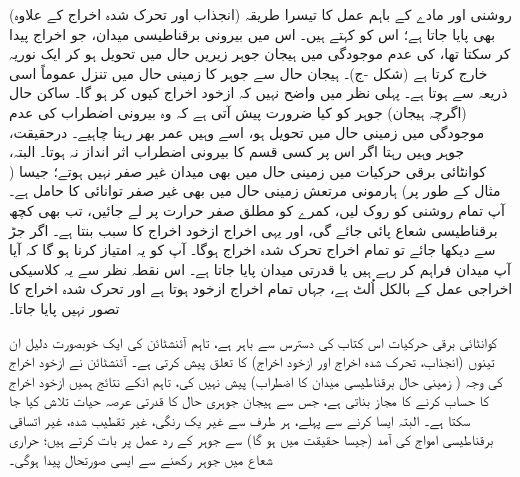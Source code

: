 (انجذاب اور تحرک شدہ اخراج کے علاوہ) روشنی اور مادے کے باہم عمل کا تیسرا طریقہ بھی پایا جاتا ہے؛ اس کو  کہتے ہیں۔ اس میں بیرونی برقناطیسی میدان، جو اخراج پیدا کر سکتا تھا، کی عدم موجودگی میں ہیجان جوہر زیریں حال میں تحویل ہو کر ایک نوریہ خارج کرتا ہے (شکل -ج)۔ 	ہیجان حال سے جوہر کا زمینی حال میں تنزل عموماً اسی ذریعہ سے ہوتا ہے۔ پہلی نظر میں واضح نہیں کہ ازخود اخراج کیوں کر ہو گا۔ ساکن حال (اگرچہ ہیجان) جوہر کو کیا ضرورت پیش آتی ہے کہ وہ بیرونی اضطراب کی عدم موجودگی میں زمینی حال میں تحویل ہو، اسے وہیں عمر بھر رہنا چاہیے۔ درحقیقت، جوہر وہیں رہتا اگر اس پر کسی قسم کا بیرونی اضطراب اثر انداز نہ ہوتا۔ البتہ، کوانٹائی برقی حرکیات میں زمینی حال میں بھی میدان غیر صفر نہیں ہوتے؛ جیسا ( مثال کے طور پر) ہارمونی مرتعش زمینی حال میں بھی غیر صفر توانائی  کا حامل ہے۔ آپ تمام روشنی کو روک لیں، کمرے کو مطلق صفر حرارت پر لے جائیں، تب بھی کچھ برقناطیسی شعاع پائی جائے گی، اور یہی  اخراج ازخود اخراج کا سبب بنتا ہے۔ اگر جڑ سے دیکھا جائے تو تمام اخراج تحرک شدہ اخراج ہوگا۔ آپ کو یہ امتیاز کرنا ہو گا کہ آیا آپ میدان فراہم کر رہے ہیں یا قدرتی میدان پایا جاتا ہے۔ اس نقطہ نظر سے یہ کلاسیکی اخراجی عمل کے بالکل اُلٹ ہے، جہاں تمام اخراج ازخود ہوتا ہے اور تحرک شدہ اخراج کا تصور نہیں پایا جاتا۔

کوانٹائی برقی حرکیات اس کتاب کی دسترس سے باہر ہے، تاہم آئنشٹائن کی ایک خوبصورت دلیل ان تینوں (انجذاب، تحرک شدہ اخراج اور ازخود اخراج) کا تعلق پیش کرتی ہے۔ آئنشٹائن نے ازخود اخراج کی وجہ ( زمینی حال برقناطیسی میدان کا اضطراب) پیش نہیں کی، تاہم انکے نتائج ہمیں ازخود اخراج کا حساب کرنے کا مجاز بناتی ہے، جس سے ہیجان جوہری حال کا قدرتی عرصہ حیات تلاش کیا جا سکتا ہے۔ البتہ ایسا کرنے سے پہلے، ہر طرف سے غیر یک رنگی، غیر تقطیب شدہ، غیر اتساقی برقناطیسی امواج کی آمد (جیسا حقیقت میں ہو گا) سے جوہر کے رد عمل پر بات کرتے ہیں؛ حراری شعاع میں جوہر رکھنے سے ایسی صورتحال پیدا ہوگی۔

